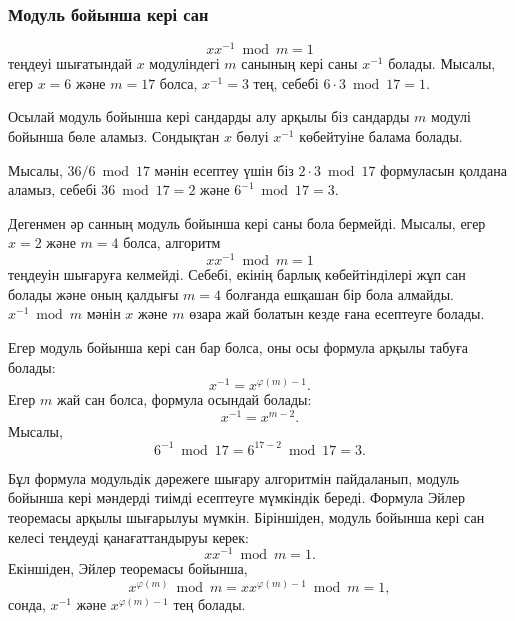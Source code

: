 \subsubsection{Модуль бойынша кері сан}


\[ x x^{-1} \bmod m = 1 \] теңдеуі шығатындай $x$ модуліндегі $m$ санының кері саны $x^{-1}$ болады.
Мысалы, егер $x=6$ және $m=17$ болса,
$x^{-1}=3$ тең, себебі $6\cdot3 \bmod 17=1$.

Осылай модуль бойынша кері сандарды алу арқылы 
біз сандарды $m$ модулі бойынша бөле аламыз.
Сондықтан $x$ бөлуі $x^{-1}$ көбейтуіне балама болады.

Мысалы, $36/6 \bmod 17$ мәнін есептеу үшін біз $2 \cdot 3 \bmod 17$
формуласын қолдана аламыз, себебі $36 \bmod 17 = 2$ және 
$6^{-1} \bmod 17 = 3$.

Дегенмен әр санның модуль бойынша кері саны бола бермейді.
Мысалы, егер $x=2$ және $m=4$ болса, алгоритм 
\[ x x^{-1} \bmod m = 1 \]
теңдеуін шығаруға келмейді. Себебі, екінің барлық көбейтінділері
жұп сан болады және оның қалдығы $m=4$ болғанда ешқашан бір бола алмайды.
$x^{-1} \bmod m$ мәнін $x$ және $m$ өзара жай болатын кезде ғана есептеуге болады.

Егер модуль бойынша кері сан бар болса, оны осы формула арқылы
табуға болады:
\[
x^{-1} = x^{\varphi(m)-1}.
\]
Егер $m$ жай сан болса, формула осындай болады:
\[
x^{-1} = x^{m-2}.
\]
Мысалы,
\[6^{-1} \bmod 17 =6^{17-2} \bmod 17 = 3.\]

Бұл формула модульдік дәрежеге шығару алгоритмін пайдаланып, модуль
бойынша кері мәндерді тиімді есептеуге мүмкіндік береді.
Формула Эйлер теоремасы арқылы шығарылуы мүмкін.
Біріншіден, модуль бойынша кері сан келесі теңдеуді қанағаттандыруы керек:
\[
x x^{-1} \bmod m = 1.
\]
Екіншіден, Эйлер теоремасы бойынша,
\[
x^{\varphi(m)} \bmod m =  xx^{\varphi(m)-1} \bmod m = 1,
\]
сонда, $x^{-1}$ және $x^{\varphi(m)-1}$ тең болады.

